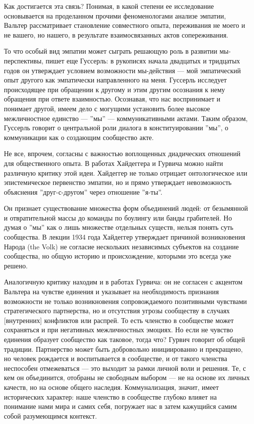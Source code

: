 \documentclass[11pt]{book}
\begin{document}
Как достигается эта связь? Понимая, в какой степени ее исследование основывается на проделанном прочими феноменологами анализе эмпатии, Вальтер рассматривает становление совместного опыта, переживания не моего и не вашего, но нашего, в результате взаимосвязанных актов сопереживания.

То что особый вид эмпатии может сыграть решающую роль в развитии мы-перспективы, пишет еще Гуссерль: в рукописях начала двадцатых и тридцатых годов он утверждает условием возможности мы-действия --- мой эмпатический опыт другого как эмпатически направленного на меня. Гуссерль исследует происходящее при обращении к другому и этим другим осознания к нему обращения при ответе взаимностью. Осознавая, что нас воспринимает и понимает другой, имеем дело с могущими установить более высокое межличностное единство --- ''мы'' --- коммуникативными актами. Таким образом, Гуссерль говорит о центральной роли диалога в конституировании ''мы'', о коммуникации как о создающим сообщество акте.

Не все, впрочем, согласны с важностью воплощенных диадических отношений для общественного опыта. В работах Хайдеггера и Гурвича можно найти различную критику этой идеи. Хайдеггер не только отрицает онтологическое или эпистемическое первенство эмпатии, но и прямо утверждает невозможность объяснения ''друг-с-другом'' через отношение ''я-ты''.

Он признает существование множества форм объединений людей: от безымянной и отвратительной массы до команды по боулингу или банды грабителей. Но думая о ''мы'' как о лишь множестве отдельных существ, нельзя понять суть сообщества. В лекции 1934 года Хайдеггер утверждает причиной возникновения Народа (the Volk) не согласие нескольких независимых субъектов на создание сообщества, но общую историю и происхождение, которыми это всегда уже решено.

Аналогичную критику находим и в работах Гурвича: он не согласен с акцентом Вальтера на чувстве единения и указывает на необходимость признания возможности не только возникновения сопровождаемого позитивными чувствами стратегического партнерства, но и отсутствия угрозы сообществу в случаях [внутренних] конфликтов или распрей. То есть членство в сообществе может сохраняться и при негативных межличностных эмоциях. Но если не чувство единения образует сообщество как таковое, тогда что? Гурвич говорит об общей традиции. Партнерство может быть добровольно инициированно и прекращено, но человек рождается и воспитывается в сообществе, и от такого членства неспособен отмежеваться --- это выходит за рамки личной воли и решения. Те, с кем он объединится, отобраны не свободным выбором --- не на основе их личных качеств, но на основе общего наследия. Коммунализация, значит, имеет исторических характер: наше членство в сообществе глубоко влияет на понимание нами мира и самих себя, погружает нас в затем кажущийся самим собой разумеющимся контекст.
\end{document}
